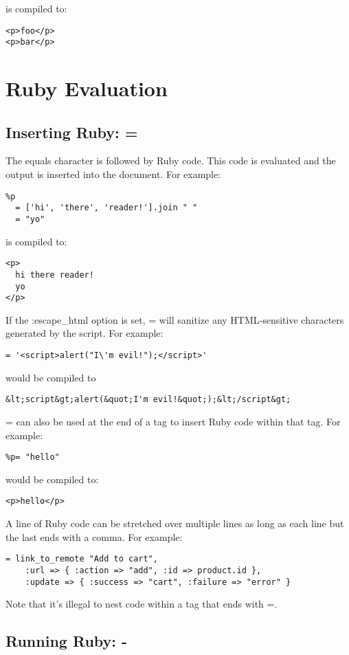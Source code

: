 \documentclass[9pt]{article}
\begin{document}
 is compiled to:
\begin{verbatim}
<p>foo</p>
<p>bar</p>
\end{verbatim}
\section{Ruby Evaluation}
\subsection{Inserting Ruby: =}


 The equals character is followed by Ruby code. This code is evaluated and the output is inserted into the document. For example:
\begin{verbatim}
%p
  = ['hi', 'there', 'reader!'].join " "
  = "yo"
\end{verbatim}


 is compiled to:
\begin{verbatim}
<p>
  hi there reader!
  yo
</p>
\end{verbatim}


 If the :escape\_html option is set, = will sanitize any HTML-sensitive characters generated by the script. For example:
\begin{verbatim}
= '<script>alert("I\'m evil!");</script>'
\end{verbatim}


 would be compiled to
\begin{verbatim}
&lt;script&gt;alert(&quot;I'm evil!&quot;);&lt;/script&gt;
\end{verbatim}


 = can also be used at the end of a tag to insert Ruby code within that tag. For example:
\begin{verbatim}
%p= "hello"
\end{verbatim}


 would be compiled to:
\begin{verbatim}
<p>hello</p>
\end{verbatim}


 A line of Ruby code can be stretched over multiple lines as long as each line but the last ends with a comma. For example:
\begin{verbatim}
= link_to_remote "Add to cart",
    :url => { :action => "add", :id => product.id },
    :update => { :success => "cart", :failure => "error" }
\end{verbatim}


 Note that it’s illegal to nest code within a tag that ends with =.
\subsection{Running Ruby: -}
\end{document}
